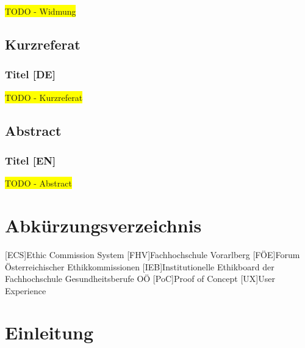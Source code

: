 \colorbox{yellow}{TODO - Widmung}

\newpage
\section*{Kurzreferat}
\label{sec:abstract-de}

\subsection*{Titel [DE]}

\colorbox{yellow}{TODO - Kurzreferat}

\newpage
\section*{Abstract}
\label{sec:abstract-en}

\subsection*{Titel [EN]}

\colorbox{yellow}{TODO - Abstract}

\cleardoublepage
\tableofcontents

\clearpage
{}
{}
\listoffigures

\clearpage
{}
{}
\chapter*{Abkürzungsverzeichnis}

\begin{acronym}
    [ECS]{Ethic Commission System}
    [FHV]{Fachhochschule Vorarlberg}
    [FÖE]{Forum Österreichischer Ethikkommissionen}
    [IEB]{Institutionelle Ethikboard der Fachhochschule Gesundheitsberufe OÖ}
    [PoC]{Proof of Concept}
    [UX]{User Experience}
\end{acronym}

\cleardoublepage
{}

\chapter{Einleitung}
\label{chap:einleitung}

